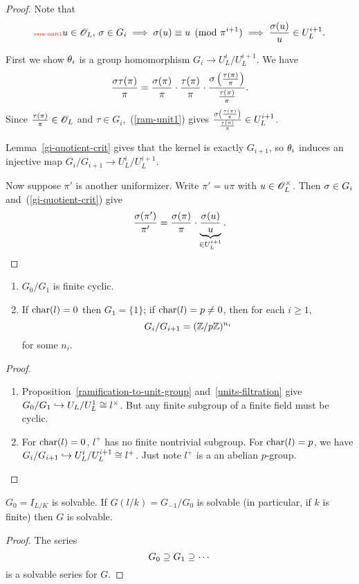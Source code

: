 \begin{proof}
Note that 
\begin{equation}\llabel{ram-unit1}
u\in \sO_L,\,\si\in G_i\implies\si(u)\equiv u\pmod{\pi^{i+1}}\implies \fc{\si(u)}{u}\in U_L^{i+1}.
\end{equation}

First we show $\theta_i$ is a group homomorphism $G_i\to U_L^i/U_L^{i+1}$. We have
\[
\frac{\sigma\tau(\pi)}{\pi}
= \frac{\sigma(\pi)}{\pi}\cdot \frac{\tau(\pi)}{\pi}\cdot \frac{\sigma\left( {\frac{\tau(\pi)}{\pi}} \right)}{\frac{\tau(\pi)}{\pi}}.
\]
Since $\frac{\tau(\pi)}{\pi}\in \mathscr{O}_L$ and $\tau\in G_i$,~(\ref{ram-unit1}) gives $\frac{\sigma\left( {\frac{\tau(\pi)}{\pi}} \right)}{\frac{\tau(\pi)}{\pi}}\in U_L^{i+1}$. 

Lemma~\ref{gi-quotient-crit} gives that the kernel is exactly $G_{i+1}$, so $\theta_i$ induces an injective map $G_i/G_{i+1}\to U_L^i/U_L^{i+1}$.

Now suppose $\pi'$ is another uniformizer. Write $\pi'=u\pi$ with $u\in\mathscr{O}_L^{\times}$. Then $\sigma\in G_i$ and~(\ref{gi-quotient-crit}) give
\[
\frac{\sigma(\pi')}{\pi'} = \frac{\sigma(\pi)}{\pi} \cdot \underbrace{\frac{\sigma(u)}{u}}_{\in U_L^{i+1}}.\qedhere
\]
\end{proof}
\begin{cor}
\begin{enumerate}
\item
$G_0/G_1$ is finite cyclic.
\item
If $\operatorname{char}(l)=0$ then $G_1=\{1\}$; if $\operatorname{char}(l)=p\ne 0$, then for each $i\ge 1$, \[G_i/G_{i+1}=(\mathbb{Z}/p\mathbb{Z})^{n_i}\]
for some $n_i$.
\end{enumerate}
\end{cor}
\begin{proof}
\begin{enumerate}
\item
Proposition~\ref{ramification-to-unit-group} and~\ref{units-filtration} give $G_0/G_1\hookrightarrow U_L/U_L^1\cong  l^{\times}$. But any finite subgroup of a finite field must be cyclic.
\item 
For $\operatorname{char}(l)=0$, $l^{+}$ has no finite nontrivial subgroup. %
For $\operatorname{char}(l)=p$, we have $G_i/G_{i+1}\hookrightarrow U_L^i/U_L^{i+1}\cong l^{+}$. Just note $l^+$ is a an abelian $p$-group.\qedhere
\end{enumerate}
\end{proof}
\begin{cor}
$G_0=I_{L/K}$ is solvable. If $G(l/k)=G_{-1}/G_0$ is solvable (in particular, if $k$ is finite) then $G$ is solvable. 
\end{cor}
\begin{proof}
The series
\[
G_0\supseteq G_1\supseteq \cdots
\]
is a solvable series for $G$.
\end{proof}
